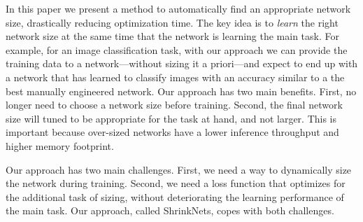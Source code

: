 \documentclass[sigconf]{acmart}
\newcommand{\gl}[1]{\textcolor{violet}{{\bf Gl:} #1}}
\begin{document}
In this paper we present a method to automatically find an appropriate network
size,
drastically reducing optimization time.
The key idea is to
\emph{learn} the right network size at the same time that the network is
learning the main task. For example, for an image classification task, with our
approach we can provide the training data to a network---without sizing it a
priori---and expect to end up with a network that has learned to classify images
with an accuracy similar to a the best manually engineered network.
Our approach has two main benefits. First, no longer need to choose a
network size before training. Second, the final network size will tuned to be
appropriate for the task at hand, and not larger. 
This is important
because over-sized networks have a lower inference throughput and higher memory
footprint.

Our approach has two main challenges. First, we need a way to dynamically size the
network during training. Second, we need a loss function that optimizes
for the additional task of sizing, without deteriorating the learning
performance of the main task. Our approach, called ShrinkNets, copes with both
challenges.

% 
% 
\end{document}
